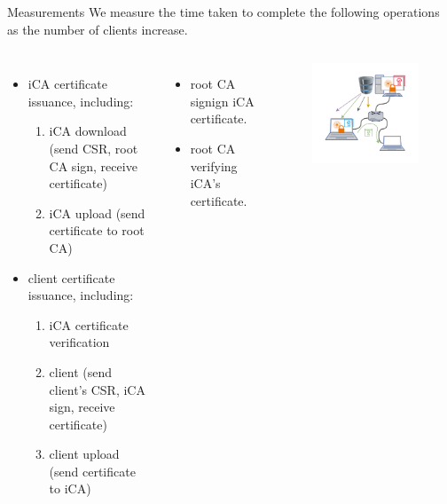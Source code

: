 \documentclass[10pt]{beamer}
\begin{document}
\begin{frame}{Measurements}
	We measure the time taken to complete the following operations as the number of clients increase.
	
	\begin{columns}[T]	
		\begin{itemize}
			\item iCA certificate issuance, including:
			\begin{enumerate}
				\item iCA download (send CSR, root CA sign, receive certificate)
				\item iCA upload (send certificate to root CA)
			\end{enumerate}
			\item client certificate issuance, including:
			\begin{enumerate}
				\item iCA certificate verification
				\item client (send client's CSR, iCA sign, receive certificate)
				\item client upload (send certificate to iCA)
			\end{enumerate}
		\end{itemize}
		\begin{itemize}
			\item root CA signign iCA certificate.
			\item root CA verifying iCA's certificate.
		\end{itemize}
		\begin{figure}
			\includegraphics[width=.8\textwidth,trim={0.5cm 0.5cm 0.5cm 0.5cm},clip]{images/topology.drawio.pdf}
		\end{figure}
	\end{columns}
	
\end{frame}
\end{document}
